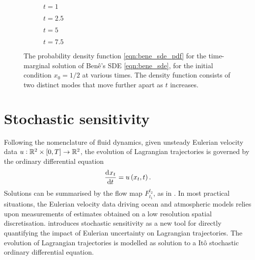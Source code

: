\begin{figure}
	\begin{center}
\begin{subfigure}{0.49\textwidth}
	\caption{\(t = 1\)}
	\label{fig:bene_1}
\end{subfigure}
\begin{subfigure}{0.49\textwidth}
	\caption{\(t = 2.5\)}
	\label{fig:bene_2.5}
\end{subfigure}
\begin{subfigure}{0.49\textwidth}
	\caption{\(t = 5\)}
	\label{fig:bene_5}
\end{subfigure}
\begin{subfigure}{0.49\textwidth}
	\caption{\(t = 7.5\)}
	\label{fig:bene_7.5}
\end{subfigure}
	\end{center}
	\caption{The probability density function \eqref{eqn:bene_sde_pdf} for the time-marginal solution of Ben\^e's SDE \eqref{eqn:bene_sde}, for the initial condition \(x_0 = 1/2\) at various times.
	The density function consists of two distinct modes that move further apart as \(t\) increases.}
	\label{fig:bene_pdf}
\end{figure}


\section{Stochastic sensitivity}

Following the nomenclature of fluid dynamics, given unsteady Eulerian velocity data \(u: \mathbb{R}^2 \times [0,T] \to \mathbb{R}^2\), the evolution of Lagrangian trajectories is governed by the ordinary differential equation 
\[
	\dod{x_t}{t} = u\left(x_t, t\right).
\]
Solutions can be summarised by the flow map \(F_{t_1}^{t_2}\), as in .
In most practical situations, the Eulerian velocity data driving ocean and atmospheric models relies upon measurements of estimates obtained on a low resolution spatial discretisation.
\citet{Balasuriya_2020_StochasticSensitivityComputable} introduces stochastic sensitivity as a new tool for directly quantifying the impact of Eulerian uncertainty on Lagrangian trajectories.
The evolution of Lagrangian trajectories is modelled as solution to a It\^o stochastic ordinary differential equation.

